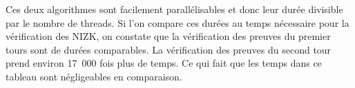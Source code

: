 \documentclass[../report]{subfiles}
\begin{document}
Ces deux algorithmes sont facilement parallélisables et donc leur durée divisible par le nombre de threads. 
Si l'on compare ces durées au temps nécessaire pour la vérification des NIZK, on constate que la vérification des 
preuves du premier tours sont de durées comparables.
La vérification des preuves du second tour prend environ 17~000 fois plus de temps.
Ce qui fait que les temps dans ce tableau sont négligeables en comparaison.

\end{document}
